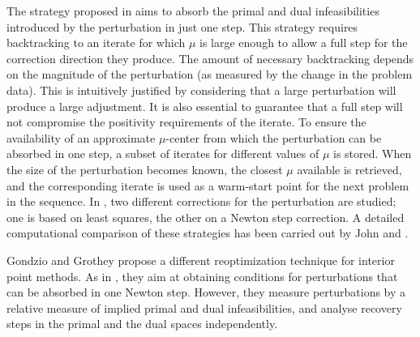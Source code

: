 The strategy proposed in \cite{YildirimWright} aims to absorb the 
primal and dual infeasibilities introduced by the perturbation in just 
one step.
This strategy requires backtracking to an iterate for which $\mu$ is 
large enough to allow a full step for the correction direction they produce. 
The amount of necessary backtracking depends on the magnitude 
of the perturbation (as measured by the change in the problem data).
This is intuitively justified by considering that a large perturbation 
will produce a large adjustment. It is also essential to guarantee that 
a full step will not compromise the positivity requirements of the 
iterate.
%
To ensure the availability of an approximate $\mu$-center from which 
the perturbation can be absorbed in one step, a subset of 
iterates for different values of $\mu$ is stored.
When the size of the perturbation becomes known, the closest $\mu$ 
available is retrieved, and the corresponding iterate is used as a 
warm-start point for the next problem in the sequence.
%
In \cite{YildirimWright}, two different corrections for the perturbation
are studied; one is based on least squares, the other on a Newton step 
correction.
A detailed computational comparison of these strategies has been 
carried out by John and \yildirim \cite{JohnYildirim}.

Gondzio and Grothey \cite{GondzioGrothey03} propose a different 
reoptimization technique for interior point methods.
As in \cite{YildirimWright}, they aim at obtaining conditions for 
perturbations that can be absorbed in one Newton step.
However, they measure perturbations by a relative measure of implied
primal and dual infeasibilities, and analyse recovery steps in
the primal and the dual spaces independently.

